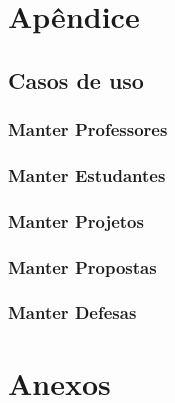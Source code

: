 \chapter{Apêndice}
\clearpage
\section{Casos de uso}
\subsection{Manter Professores}


\clearpage
\subsection{Manter Estudantes}


\clearpage
\subsection{Manter Projetos}


\clearpage
\subsection{Manter Propostas}


\clearpage
\subsection{Manter Defesas}



\chapter{Anexos}
\clearpage
